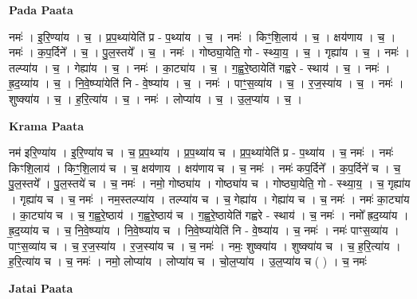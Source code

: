 \documentclass[17pt]{extarticle}
\begin{document}
\textbf{Pada Paata} \newline

नमः॑ । इ॒रि॒ण्या॑य । च॒ । प्र॒प॒थ्या॑येति॑ प्र - प॒थ्या॑य । च॒ । नमः॑ । किꣳ॒॒शि॒लाय॑ । च॒ । क्षय॑णाय । च॒ । नमः॑ । क॒प॒र्दिने᳚ । च॒ । पु॒ल॒स्तये᳚ । च॒ । नमः॑ । गोष्ठ्या॒येति॒ गो - स्थ्या॒य॒ । च॒ । गृह्या॑य । च॒ । नमः॑ । तल्प्या॑य । च॒ । गेह्या॑य । च॒ । नमः॑ । का॒ट्या॑य । च॒ । ग॒ह्व॒रे॒ष्ठायेति॑ गह्वरे - स्थाय॑ । च॒ । नमः॑ । ह्र॒द॒य्या॑य । च॒ । नि॒वे॒ष्प्या॑येति॑ नि - वे॒ष्प्या॑य । च॒ । नमः॑ । पाꣳ॒॒स॒व्या॑य । च॒ । र॒ज॒स्या॑य । च॒ । नमः॑ । शुष्क्या॑य । च॒ । ह॒रि॒त्या॑य । च॒ । नमः॑ । लोप्या॑य । च॒ । उ॒ल॒प्या॑य । च॒ ।  \newline


\textbf{Krama Paata} \newline

नम॑ इरि॒ण्या॑य । इ॒रि॒ण्या॑य च । च॒ प्र॒प॒थ्या॑य । प्र॒प॒थ्या॑य च । प्र॒प॒थ्या॑येति॑ प्र - प॒थ्या॑य । च॒ नमः॑ । नमः॑ किꣳशि॒लाय॑ । किꣳ॒॒शि॒लाय॑ च । च॒ क्षय॑णाय । क्षय॑णाय च । च॒ नमः॑ । नमः॑ कप॒र्दिने᳚ । क॒प॒र्दिने॑ च । च॒ पु॒ल॒स्तये᳚ । पु॒ल॒स्तये॑ च । च॒ नमः॑ । नमो॒ गोष्ठ्या॑य । गोष्ठ्या॑य च । गोष्ठ्या॒येति॒ गो - स्थ्या॒य॒ । च॒ गृह्या॑य । गृह्या॑य च । च॒ नमः॑ । नम॒स्तल्प्या॑य । तल्प्या॑य च । च॒ गेह्या॑य । गेह्या॑य च । च॒ नमः॑ । नमः॑ का॒ट्या॑य । का॒ट्या॑य च । च॒ ग॒ह्व॒रे॒ष्ठाय॑ । ग॒ह्व॒रे॒ष्ठाय॑ च । ग॒ह्व॒रे॒ष्ठायेति॑ गह्वरे - स्थाय॑ । च॒ नमः॑ । नमो᳚ ह्रद॒य्या॑य । ह्र॒द॒य्या॑य च । च॒ नि॒वे॒ष्प्या॑य । नि॒वे॒ष्प्या॑य च । नि॒वे॒ष्प्या॑येति॑ नि - वे॒ष्प्या॑य । च॒ नमः॑ । नमः॑ पाꣳस॒व्या॑य । पाꣳ॒॒स॒व्या॑य च । च॒ र॒ज॒स्या॑य । र॒ज॒स्या॑य च । च॒ नमः॑ । नमः॒ शुष्क्या॑य । शुष्क्या॑य च । च॒ ह॒रि॒त्या॑य । ह॒रि॒त्या॑य च । च॒ नमः॑ । नमो॒ लोप्या॑य । लोप्या॑य च । चो॒ल॒प्या॑य । उ॒ल॒प्या॑य च ( ) । च॒ नमः॑ \newline

\textbf{Jatai Paata} \newline
\end{document}
